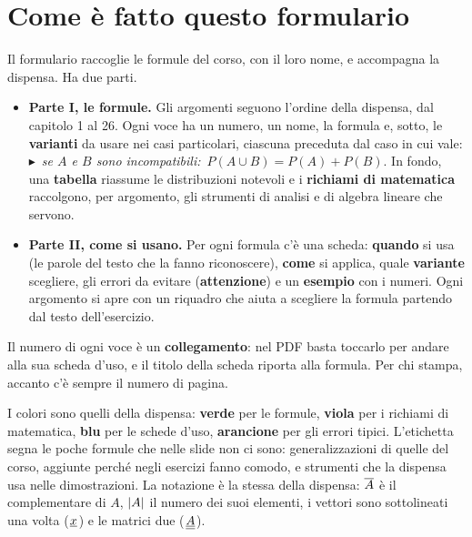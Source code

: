 \section*{Come è fatto questo formulario}
\gdef\currentchapter{Introduzione}

Il formulario raccoglie le formule del corso, con il loro nome, e accompagna la dispensa. Ha due parti.
\begin{itemize}[itemsep=2pt]
  \item \textbf{Parte I, le formule.} Gli argomenti seguono l'ordine della dispensa, dal capitolo 1 al 26. Ogni voce
        ha un numero, un nome, la formula e, sotto, le \textbf{varianti} da usare nei casi particolari, ciascuna
        preceduta dal caso in cui vale: {\color{fcolore}\footnotesize$\blacktriangleright$}\ \textit{se $A$ e $B$
        sono incompatibili:}\ $P(A \cup B) = P(A) + P(B)$. In fondo, una \textbf{tabella} riassume le distribuzioni
        notevoli e i \textbf{richiami di matematica} raccolgono, per argomento, gli strumenti di analisi e di algebra
        lineare che servono.
  \item \textbf{Parte II, come si usano.} Per ogni formula c'è una scheda: \textbf{quando} si usa (le parole del
        testo che la fanno riconoscere), \textbf{come} si applica, quale \textbf{variante} scegliere, gli errori da
        evitare (\textbf{attenzione}) e un \textbf{esempio} con i numeri. Ogni argomento si apre con un riquadro che
        aiuta a scegliere la formula partendo dal testo dell'esercizio.
\end{itemize}

Il numero di ogni voce è un \textbf{collegamento}: nel PDF basta toccarlo per andare alla sua scheda d'uso, e il
titolo della scheda riporta alla formula. Per chi stampa, accanto c'è sempre il numero di pagina.

I colori sono quelli della dispensa: \textcolor{mspiform!80!black}{\textbf{verde}} per le formule,
\textcolor{mspiric!85!black}{\textbf{viola}} per i richiami di matematica, \textcolor{mspiteo!85!black}{\textbf{blu}}
per le schede d'uso, \textcolor{mspiB!85!black}{\textbf{arancione}} per gli errori tipici. L'etichetta \oltre{} segna
le poche formule che nelle slide non ci sono: generalizzazioni di quelle del corso, aggiunte perché negli esercizi
fanno comodo, e strumenti che la dispensa usa nelle dimostrazioni. La notazione è la stessa della dispensa:
$\overline{A}$ è il complementare di $A$, $\left\lvert A \right\rvert$ il numero dei suoi elementi, i vettori sono sottolineati una volta
(${\mkern1mu\underline{x}\mkern1mu}$) e le matrici due (${\mkern1mu\underline{\underline{A}}\mkern1mu}$).
